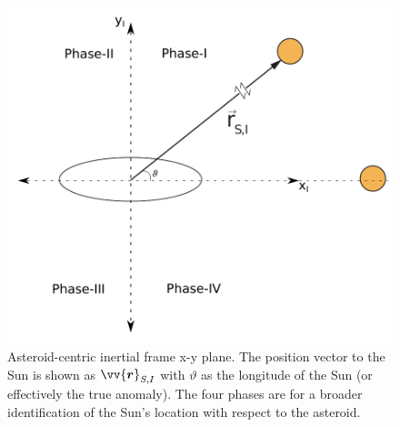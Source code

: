 \begin{figure}[htb]
\centering
\captionsetup{justification=centering}
\includegraphics[width=\textwidth, height=0.35\textheight, keepaspectratio=true]{solar_phase_and_inertial_frame_3.pdf}
\caption{Asteroid-centric inertial frame x-y plane. The position vector to the Sun is shown as $\protect\vv{\bm{r}}_{S,I}$ with $\vartheta$ as the longitude of the Sun (or effectively the true anomaly). The four phases are for a broader identification of the Sun's location with respect to the asteroid.}
\label{fig:solar_phase_and_inertial_frame}
\end{figure}
\FloatBarrier
